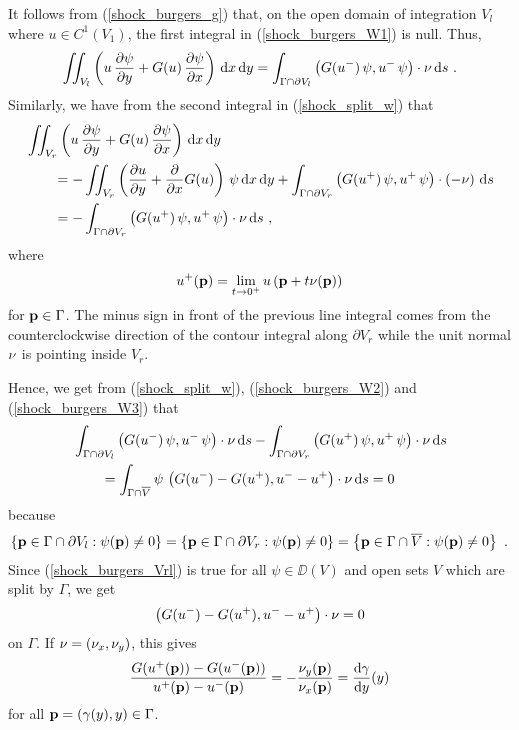 It follows from (\ref{shock_burgers_g}) that, on the open
domain of integration $V_l$ where $\displaystyle u \in C^1(V_1)$, the
first integral in (\ref{shock_burgers_W1}) is null.  Thus,
\begin{equation} \label{shock_burgers_W2}
\iint_{V_l}
\left(u\,\frac{\partial{\psi}}{\partial y} + G(u)\,\frac{\partial{\psi}}{\partial x} \right) \,\mathrm{d}{x}\,\mathrm{d}{y}
= \int_{\Gamma\cap\partial V_l} \left(G(u^-)\,\psi, u^-\,\psi \right)\cdot
\mathbf{\nu} \,\mathrm{d}{s} \ .
\end{equation}
Similarly, we have from the second integral in (\ref{shock_split_w}) that
\begin{align}
& \iint_{V_r}
\left(u\,\pdydx{\psi}{y} + G(u)\,\pdydx{\psi}{x} \right) \dx{x}\dx{y}
\nonumber \\
&\qquad = -\iint_{V_r}
\left( \pdydx{u}{y} + \pdfdx{G(u)}{x} \right)\,\psi  \dx{x}\dx{y}
+ \int_{\Gamma\cap\partial V_r}  \left(G(u^+)\,\psi, u^+\,\psi \right)\cdot
\left(-\VEC{\nu} \right) \dx{s} \nonumber \\
&\qquad = -\int_{\Gamma\cap\partial V_r}
\left(G(u^+)\,\psi, u^+\,\psi \right)\cdot \VEC{\nu} \dx{s} \ ,
\label{shock_burgers_W3}
\end{align}
where
\[
u^+(\mathbf{p}) = \lim_{t\rightarrow 0^+}
u\left(\mathbf{p}+t \mathbf{\nu}(\mathbf{p})\right)
\]
for $\mathbf{p} \in \Gamma$.
The minus sign in front of the previous line integral comes from the
counterclockwise direction of the contour integral along $\partial V_r$
while the unit normal $\mathbf{\nu}$ is pointing inside $V_r$.

Hence, we get from (\ref{shock_split_w}), (\ref{shock_burgers_W2}) and
(\ref{shock_burgers_W3}) that
\begin{align}
& \int_{\Gamma\cap \partial V_l} \left(G(u^-)\,\psi, u^-\,\psi \right)\cdot
\mathbf{\nu} \,\mathrm{d}{s}
- \int_{\Gamma\cap\partial V_r} \left(G(u^+)\,\psi, u^+\,\psi \right)\cdot
\mathbf{\nu} \,\mathrm{d}{s} \nonumber \\
&\qquad = \int_{\Gamma\cap \overline{V}} \psi\,
\left(G(u^-)-G(u^+), u^- - u^+\right)
\cdot \mathbf{\nu} \,\mathrm{d}{s} = 0 \label{shock_burgers_Vrl}
\end{align}
because
\[
\left\{ \mathbf{p} \in \Gamma \cap \partial V_l : \psi(\mathbf{p}) \neq 0 \right\}
=\left\{ \mathbf{p} \in \Gamma \cap \partial V_r : \psi(\mathbf{p}) \neq 0 \right\}
=\left\{ \mathbf{p} \in \Gamma \cap \overline{V} : \psi(\mathbf{p}) \neq 0 \right\}
\ .
\]
Since (\ref{shock_burgers_Vrl}) is true for all
$\psi \in \DD(V)$ and open sets $V$ which are split by $\Gamma$, we get
\[
\left(G(u^-)-G(u^+), u^- - u^+\right)\cdot \mathbf{\nu} = 0
\]
on $\Gamma$.  If $\mathbf{\nu} = (\nu_x, \nu_y)$, this gives
\begin{equation}\label{shock_rank_hug}
\frac{G(u^+(\mathbf{p}))-G(u^-(\mathbf{p}))}{u^+(\mathbf{p}) - u^-(\mathbf{p})}
= -\frac{\nu_y(\mathbf{p})}{\nu_x(\mathbf{p})} = \frac{\mathrm{d}\gamma}{\mathrm{d}{y}}(y)
\end{equation}
for all $\mathbf{p}=(\gamma(y),y) \in \Gamma$.

